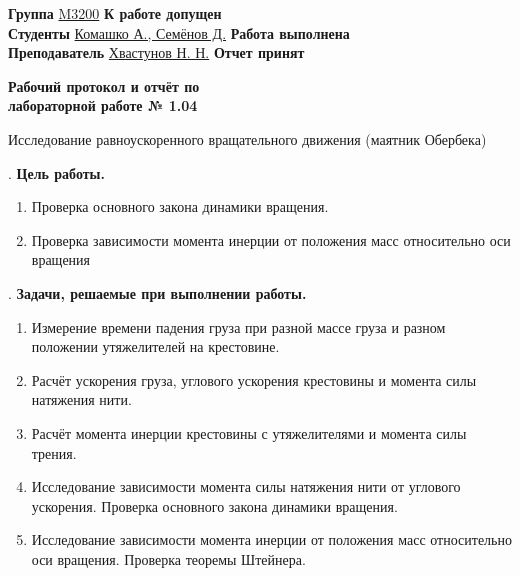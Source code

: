 \documentclass[12pt]{article}
\begin{document}
    \vspace*{2\baselineskip}

    \thispagestyle{fancy}

    \noindent
    \textbf{Группа} \underline{M3200\hspace{4.5cm}} \hfill \textbf{К работе допущен} \underline{\hspace{4cm}} \\[0.5cm]
    \textbf{Студенты} \underline{Комашко А., Семёнов Д.\hspace{0.45cm}} \hfill \textbf{Работа выполнена} \underline{\hspace{4cm}} \\[0.5cm]
    \textbf{Преподаватель} \underline{Хвастунов Н. Н.\hspace{0.95cm}} \hfill \textbf{Отчет принят} \underline{\hspace{4.85cm}} \\


    \begin{center}
    {\huge \textbf{Рабочий протокол и отчёт по\\ лабораторной работе № 1.04}}

        \smallvspace

        {\Large Исследование равноускоренного вращательного движения (маятник Обербека)}
    \end{center}


    . \textbf{Цель работы.}

    \begin{enumerate}
        \item Проверка основного закона динамики вращения.

        \item Проверка зависимости момента инерции от положения масс относительно оси вращения
    \end{enumerate}

    \mediumvspace

    . \textbf{Задачи, решаемые при выполнении работы.}

    \begin{enumerate}
        \item Измерение времени падения груза при разной массе груза и разном положении утяжелителей на крестовине.

        \item Расчёт ускорения груза, углового ускорения крестовины и момента силы натяжения нити.

        \item Расчёт момента инерции крестовины с утяжелителями и момента силы трения.

        \item Исследование зависимости момента силы натяжения нити от углового ускорения.
        Проверка основного закона динамики вращения.

        \item Исследование зависимости момента инерции от положения масс
        относительно оси вращения. Проверка теоремы Штейнера.
    \end{enumerate}
\end{document}

